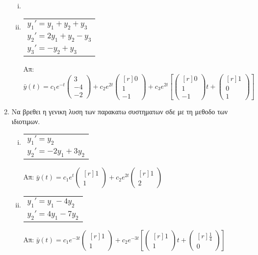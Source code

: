 \begin{enumerate}
\begin{enumerate}[i)]
\item \item  \begin{tabular}{l} $y_1'=y_1+y_2+y_3$ \\ $y_2'=2y_1+y_2-y_3$ \\ $y_3'=-y_2+y_3$\end{tabular}\hfill Απ: $\scriptstyle{\bar{y}(t)=c_1e^{-t}\begin{pmatrix*}
3\\-4\\-2
\end{pmatrix*}+c_2e^{2t}\begin{pmatrix*}[r]
0\\1\\-1
\end{pmatrix*}+c_3e^{2t}\left[\begin{pmatrix*}[r]
0\\1\\-1
\end{pmatrix*}t+\begin{pmatrix*}[r]
1\\0\\1
\end{pmatrix*}\right]}$
\end{enumerate}


\item Να βρεθει η γενικη λυση των παρακατω συστηματων σδε με τη μεθοδο των ιδιοτιμων.
\begin{enumerate}[i)]

\item \begin{tabular}{l} $y_1'=y_2$ \\ $y_2'=-2y_1+3y_2$\end{tabular} \hfill Απ:
	${\bar{y}(t)=c_1e^{t}\begin{pmatrix*}[r]
1\\1
\end{pmatrix*}+c_2e^{2t}\begin{pmatrix*}[r]
1\\2
\end{pmatrix*}}$

\item \begin{tabular}{l} $y_1'=y_1-4y_2$ \\ $y_2'=4y_1-7y_2$\end{tabular} \hfill Απ:
	${\bar{y}(t)=c_1e^{-3t}\begin{pmatrix*}[r]
1\\1
\end{pmatrix*}+c_2e^{-3t}\left[\begin{pmatrix*}[r]
1\\1
\end{pmatrix*}t+\begin{pmatrix*}[r]
\frac{1}{4}\\0
\end{pmatrix*}\right]}$


\end{enumerate}
\end{enumerate}
